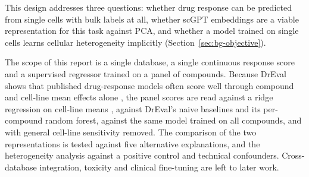 This design addresses three
questions: whether drug response can be predicted from single cells with bulk labels at all, whether
scGPT embeddings are a viable representation for this task against PCA, and whether a model trained on
single cells learns cellular heterogeneity implicitly (Section~\ref{sec:bg-objective}).


The scope of this report is a single database, a single continuous response score and a supervised
regressor trained on a panel of \NPanel{} compounds. Because DrEval shows that published drug-response
models often score well through compound and cell-line mean effects alone \cite{dreval}, the panel scores
are read against a ridge regression on cell-line means \cite{hoerl1970}, against DrEval's naive baselines
and its per-compound random forest, against the same model trained on all \NDrugsModelled{} compounds, and
with general cell-line sensitivity removed. The comparison of the two representations is tested against
five alternative explanations, and the heterogeneity analysis against a positive control and technical
confounders. Cross-database integration, toxicity and clinical fine-tuning are left to later work.
